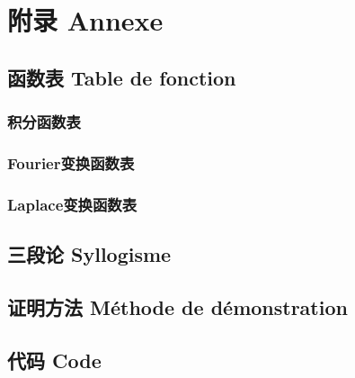 \documentclass[12pt, a4paper, oneside]{ctexbook}
\begin{document}










  \part{附录 Annexe}
  \appendix
  \chapter{函数表 Table de fonction}
  \section{积分函数表 }
  \section{Fourier变换函数表 }
  \section{Laplace变换函数表 }
  \chapter{三段论 Syllogisme}
  \chapter{证明方法 Méthode de démonstration}
  \chapter{代码 Code}

  \printindex
\end{document}
